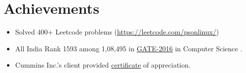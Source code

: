 \documentclass[a4paper,10pt]{article}
\begin{document}
	\section{Achievements}
	\begin{itemize}
		\item Solved 400+ Leetcode problems (\url{https://leetcode.com/psonlinux/})
		\item All India Rank 1593 among 1,08,495  in \href{https://drive.google.com/file/d/0B-2PYJZE99wQb1NCVHZFQjBsb0U/view}{GATE-2016} in Computer Science .
                \item Cummins Inc.’s client provided \href{https://drive.google.com/file/d/0B2kfGzkUmzWdbHJJZTRSLWJRVEE/view}{certificate} of appreciation.
	\end{itemize}
\end{document}
